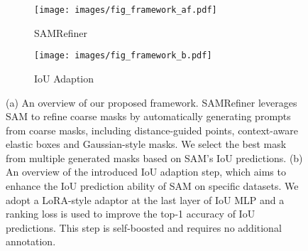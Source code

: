 \begin{figure}[tb]%
  \centering
  \begin{subfigure}{0.71\linewidth}
    \texttt{[image: images/fig\_framework\_af.pdf]}
    \caption{SAMRefiner}
    \label{fig:framework-a}
  \end{subfigure}
  \hfill
  \begin{subfigure}{0.26\linewidth}
    \texttt{[image: images/fig\_framework\_b.pdf]}
    \caption{IoU Adaption}
    \label{fig:framework-b}
  \end{subfigure}
  \caption{(a) An overview of our proposed framework. SAMRefiner leverages SAM to refine coarse masks by automatically generating prompts from coarse masks, including distance-guided points, context-aware elastic boxes and Gaussian-style masks. We select the best mask from multiple generated masks based on SAM's IoU predictions. (b) An overview of the introduced IoU adaption step, which aims to enhance the IoU prediction ability of SAM on specific datasets. We adopt a LoRA-style adaptor at the last layer of IoU MLP and a ranking loss is used to improve the top-1 accuracy of IoU predictions. This step is self-boosted and requires no additional annotation.}
  \label{fig:framework overview}
  \vspace{-4mm}
\end{figure}